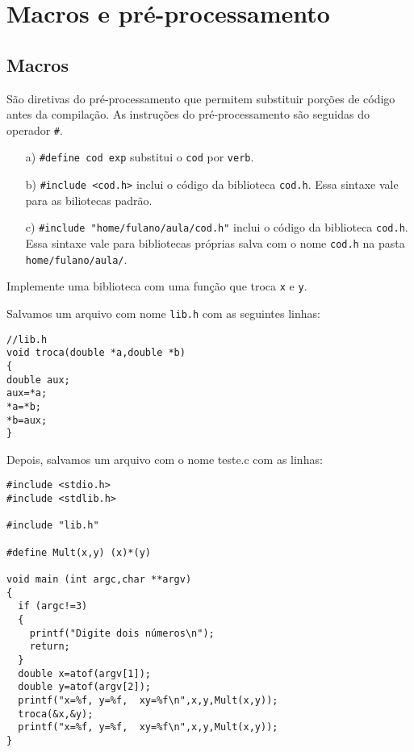 
\chapter{Macros e pré-processamento}
\section{Macros}
São diretivas do pré-processamento que permitem substituir porções de código antes da compilação. As instruções do pré-processamento são seguidas do operador \verb|#|. 
\begin{itemize}
 \item[a)] \verb|#define cod exp| substitui o \verb|cod| por \verb|verb|.
 \item[b)] \verb|#include <cod.h>| inclui o código da biblioteca \verb|cod.h|.  Essa sintaxe vale para as biliotecas padrão.
 \item[c)] \verb|#include "home/fulano/aula/cod.h"| inclui o código da biblioteca \verb|cod.h|. Essa sintaxe vale para bibliotecas próprias salva com o nome \verb|cod.h| na pasta \verb|home/fulano/aula/|.
\end{itemize}
\begin{ex}
Implemente uma biblioteca com uma função que troca \verb|x| e \verb|y|. 
\end{ex}
Salvamos um arquivo com nome \verb|lib.h| com as seguintes linhas:
\begin{verbatim}
//lib.h
void troca(double *a,double *b)
{
double aux;
aux=*a;
*a=*b;
*b=aux;
}
\end{verbatim}
Depois, salvamos um arquivo com o nome teste.c com as linhas:
\begin{verbatim}
#include <stdio.h>
#include <stdlib.h>

#include "lib.h"

#define Mult(x,y) (x)*(y)

void main (int argc,char **argv)
{
  if (argc!=3)
  {
    printf("Digite dois números\n");
    return;
  }
  double x=atof(argv[1]);
  double y=atof(argv[2]);
  printf("x=%f, y=%f,  xy=%f\n",x,y,Mult(x,y));
  troca(&x,&y);
  printf("x=%f, y=%f,  xy=%f\n",x,y,Mult(x,y));
}
\end{verbatim}

